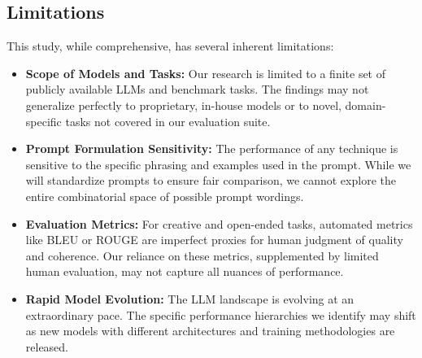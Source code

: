 \documentclass{article}
\begin{document}
\subsection{Limitations}
This study, while comprehensive, has several inherent limitations:
\begin{itemize}
    \item \textbf{Scope of Models and Tasks:} Our research is limited to a finite set of publicly available LLMs and benchmark tasks. The findings may not generalize perfectly to proprietary, in-house models or to novel, domain-specific tasks not covered in our evaluation suite.
    \item \textbf{Prompt Formulation Sensitivity:} The performance of any technique is sensitive to the specific phrasing and examples used in the prompt. While we will standardize prompts to ensure fair comparison, we cannot explore the entire combinatorial space of possible prompt wordings.
    \item \textbf{Evaluation Metrics:} For creative and open-ended tasks, automated metrics like BLEU or ROUGE are imperfect proxies for human judgment of quality and coherence. Our reliance on these metrics, supplemented by limited human evaluation, may not capture all nuances of performance.
    \item \textbf{Rapid Model Evolution:} The LLM landscape is evolving at an extraordinary pace. The specific performance hierarchies we identify may shift as new models with different architectures and training methodologies are released.
\end{itemize}
\end{document}
